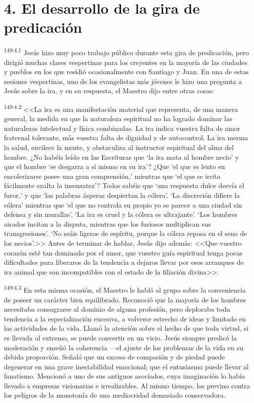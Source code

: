 \section*{4. El desarrollo de la gira de predicación}
\par 
\textsuperscript{149:4.1} Jesús hizo muy poco trabajo público durante esta gira de predicación, pero dirigió muchas clases vespertinas para los creyentes en la mayoría de las ciudades y pueblos en los que residió ocasionalmente con Santiago y Juan. En una de estas sesiones vespertinas, uno de los evangelistas más jóvenes le hizo una pregunta a Jesús sobre la ira, y en su respuesta, el Maestro dijo entre otras cosas:

\par 
\textsuperscript{149:4.2} <<La ira es una manifestación material que representa, de una manera general, la medida en que la naturaleza espiritual no ha logrado dominar las naturalezas intelectual y física combinadas. La ira indica vuestra falta de amor fraternal tolerante, más vuestra falta de dignidad y de autocontrol. La ira merma la salud, envilece la mente, y obstaculiza al instructor espiritual del alma del hombre. ¿No habéis leído en las Escrituras que `la ira mata al hombre necio' y que el hombre `se desgarra a sí mismo en su ira'? ¿Que `el que es lento en encolerizarse posee una gran comprensión,' mientras que `el que se irrita fácilmente exalta la insensatez'? Todos sabéis que `una respuesta dulce desvía el furor,' y que `las palabras ásperas despiertan la cólera'. `La discreción difiere la cólera' mientras que `el que no controla su propio yo se parece a una ciudad sin defensa y sin murallas'. `La ira es cruel y la cólera es ultrajante'. `Los hombres airados incitan a la disputa, mientras que los furiosos multiplican sus transgresiones'. `No seáis ligeros de espíritu, porque la cólera reposa en el seno de los necios'.>> Antes de terminar de hablar, Jesús dijo además: <<Que vuestro corazón esté tan dominado por el amor, que vuestro guía espiritual tenga pocas dificultades para liberaros de la tendencia a dejaros llevar por esos arranques de ira animal que son incompatibles con el estado de la filiación divina>>.

\par 
\textsuperscript{149:4.3} En esta misma ocasión, el Maestro le habló al grupo sobre la conveniencia de poseer un carácter bien equilibrado. Reconoció que la mayoría de los hombres necesitaba consagrarse al dominio de alguna profesión, pero deploraba toda tendencia a la especialización excesiva, a volverse estrecho de ideas y limitado en las actividades de la vida. Llamó la atención sobre el hecho de que toda virtud, si es llevada al extremo, se puede convertir en un vicio. Jesús siempre predicó la moderación y enseñó la coherencia ---el ajuste de los problemas de la vida en su debida proporción. Señaló que un exceso de compasión y de piedad puede degenerar en una grave inestabilidad emocional; que el entusiasmo puede llevar al fanatismo. Mencionó a uno de sus antiguos asociados, cuya imaginación lo había llevado a empresas visionarias e irrealizables. Al mismo tiempo, los previno contra los peligros de la monotonía de una mediocridad demasiado conservadora.


